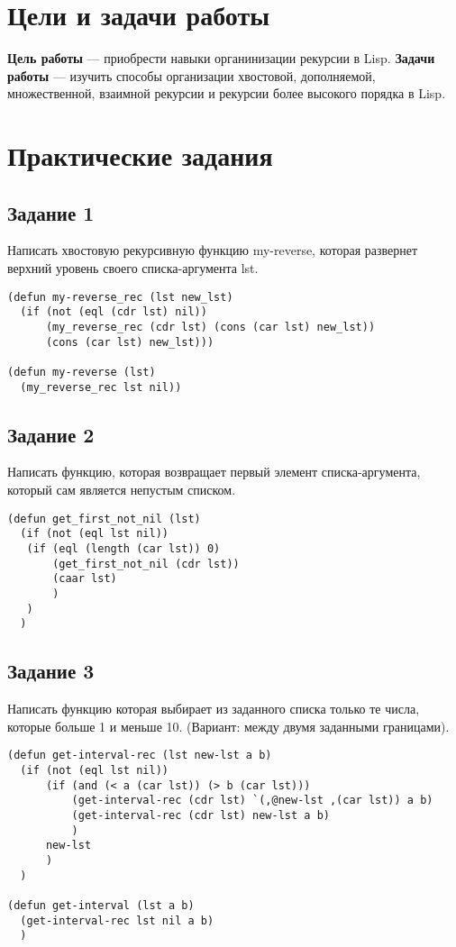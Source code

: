 \chapter{Цели и задачи работы}
\textbf{Цель работы} --- приобрести навыки органинизации рекурсии в Lisp.
\textbf{Задачи работы} --- изучить способы организации хвостовой, дополняемой, множественной,
взаимной рекурсии и рекурсии более высокого порядка в Lisp.

\chapter{Практические задания}
\section{Задание 1}
Написать хвостовую рекурсивную функцию my-reverse, которая развернет верхний уровень своего списка-аргумента lst.
\begin{lstlisting}
(defun my-reverse_rec (lst new_lst)
  (if (not (eql (cdr lst) nil))
      (my_reverse_rec (cdr lst) (cons (car lst) new_lst))
      (cons (car lst) new_lst)))

(defun my-reverse (lst)
  (my_reverse_rec lst nil))
\end{lstlisting}

\section{Задание 2}
Написать функцию, которая возвращает первый элемент списка-аргумента, который сам является непустым списком.
\begin{lstlisting}
(defun get_first_not_nil (lst)
  (if (not (eql lst nil))
   (if (eql (length (car lst)) 0)
       (get_first_not_nil (cdr lst))
       (caar lst)
       )
   )
  )
\end{lstlisting}

\section{Задание 3}
Написать функцию которая выбирает из заданного списка только те числа, которые больше 1 и меньше 10. (Вариант: между двумя заданными границами).

\begin{lstlisting}
(defun get-interval-rec (lst new-lst a b)
  (if (not (eql lst nil))
      (if (and (< a (car lst)) (> b (car lst)))
          (get-interval-rec (cdr lst) `(,@new-lst ,(car lst)) a b)
          (get-interval-rec (cdr lst) new-lst a b)
          )
      new-lst
      )
  )

(defun get-interval (lst a b)
  (get-interval-rec lst nil a b)
  )
\end{lstlisting}

